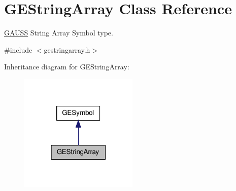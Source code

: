 \hypertarget{class_g_e_string_array}{\section{G\-E\-String\-Array Class Reference}
\label{class_g_e_string_array}
}


\hyperlink{class_g_a_u_s_s}{G\-A\-U\-S\-S} String Array Symbol type.  




{\ttfamily \#include $<$gestringarray.\-h$>$}



Inheritance diagram for G\-E\-String\-Array\-:\nopagebreak
\begin{figure}[H]
\begin{center}
\leavevmode
\includegraphics[width=160pt]{class_g_e_string_array__inherit__graph}
\end{center}
\end{figure}
